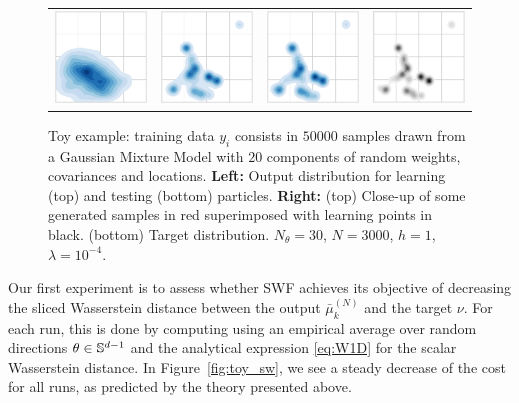 \begin{figure}
\begin{centering}
\begin{tabular}{ccc|c}
\includegraphics[width=3cm]{figures/toy_load/output_dist_k=1-crop.pdf} & \includegraphics[width=3cm]{figures/toy_load/output_dist_k=20-crop.pdf} & \includegraphics[width=3cm]{figures/toy_load/output_dist_k=70-crop.pdf} &  \includegraphics[width=3cm]{figures/target-crop.pdf}\tabularnewline
\end{tabular}
\par\end{centering}
\caption{Toy example: training data $y_i$ consists in $50 000$ samples drawn from a Gaussian Mixture Model with $20$ components of random weights, covariances and locations. \textbf{Left:} Output distribution for learning (top) and testing (bottom) particles. \textbf{Right:} (top) Close-up of some generated samples in red superimposed with learning points in black. (bottom) Target distribution. $N_\theta=30$, $N=3000$, $h=1$, $\lambda=10^{-4}$.\label{fig:toy_example}}
\end{figure}

Our first experiment is to assess whether SWF achieves its objective of decreasing the sliced Wasserstein distance between the output $\bar{\mu}_{k}^{(N)}$ and the target $\nu$. For each run, this is done by computing \label{eqn:sw} using an empirical average over random directions $\theta\in\mathbb{S}^{d-1}$ and the analytical expression \eqref{eq:W1D} for the scalar Wasserstein distance. In Figure~\ref{fig:toy_sw}, we see a steady decrease of the cost for all runs, as predicted by the theory presented above.

